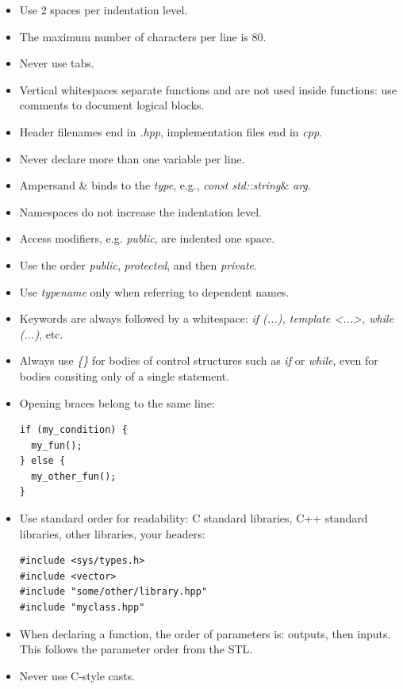 \documentclass[oneside,a4paper,titlepage]{scrartcl} %
\begin{document}
\begin{itemize}
 \item Use 2 spaces per indentation level.
 \item The maximum number of characters per line is 80.
 \item Never use tabs.
 \item Vertical whitespaces separate functions and are not used inside functions: use comments to document logical blocks.
 \item Header filenames end in \emph{.hpp}, implementation files end in \emph{cpp}.
 \item Never declare more than one variable per line.
 \item Ampersand {\&} binds to the \emph{type}, e.g., \emph{const std::string}\& \emph{arg}.
 \item Namespaces do not increase the indentation level.
 \item Access modifiers, e.g. \emph{public}, are indented one space.
 \item Use the order \emph{public}, \emph{protected}, and then \emph{private}.
 \item Use \emph{typename} only when referring to dependent names.
 \item Keywords are always followed by a whitespace: \emph{if (...), template \textless...\textgreater, while (...)}, etc.
 \item Always use \emph{\{\}} for bodies of control structures such as \emph{if} or \emph{while}, even for bodies consiting only of a single statement.
 \item Opening braces belong to the same line:
 \begin{lstlisting}
if (my_condition) {
  my_fun();
} else {
  my_other_fun();
}
 \end{lstlisting}
 \item Use standard order for readability: C standard libraries, C++ standard libraries, other libraries, your headers:
 \begin{lstlisting}
#include <sys/types.h>
#include <vector>
#include "some/other/library.hpp"
#include "myclass.hpp"
 \end{lstlisting}
 \item When declaring a function, the order of parameters is: outputs, then inputs. This follows the parameter order from the STL.
 \item Never use C-style casts.
\end{itemize}

\newpage
\end{document}
